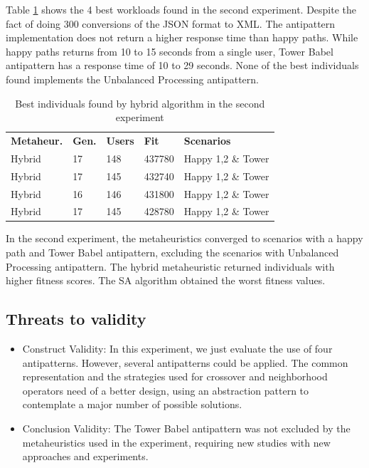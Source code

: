 \documentclass[espaco=umemeio,chapter=TITLE,twoside,openright]{abnt}
\begin{document}
Table \ref{tab:bestindividuals2} shows the 4 best workloads found in the second experiment. Despite the fact of doing 300 conversions of the JSON format to XML. The antipattern implementation does not return a higher response time than happy paths. While happy paths returns from 10 to 15 seconds from a single user, Tower Babel antipattern has a response time of 10 to 29 seconds. None of the best individuals found implements the Unbalanced Processing antipattern.


\begin{table}[h]
\centering
\caption{Best individuals found by hybrid algorithm in the second experiment}
\label{tab:bestindividuals2}
\begin{tabular}{lllll}
\rowcolor[HTML]{FFCCC9}
\textbf{Metaheur.} & \textbf{Gen.} & \textbf{Users} & \textbf{Fit} & \textbf{Scenarios}  \\
\multicolumn{1}{l}{Hybrid} & \multicolumn{1}{l}{17} & \multicolumn{1}{l}{148} & \multicolumn{1}{l}{437780} & \multicolumn{1}{l}{Happy 1,2 \& Tower}  \\
\multicolumn{1}{l}{Hybrid} & \multicolumn{1}{l}{17} & \multicolumn{1}{l}{145} & \multicolumn{1}{l}{432740} & \multicolumn{1}{l}{Happy 1,2 \& Tower}  \\
\multicolumn{1}{l}{Hybrid} & \multicolumn{1}{l}{16} & \multicolumn{1}{l}{146} & \multicolumn{1}{l}{431800} & \multicolumn{1}{l}{Happy 1,2 \& Tower} \\
\multicolumn{1}{l}{Hybrid} & \multicolumn{1}{l}{17} & \multicolumn{1}{l}{145} & \multicolumn{1}{l}{428780} & \multicolumn{1}{l}{Happy 1,2 \& Tower}  \\
\end{tabular}
\end{table}

In the second experiment, the metaheuristics converged to scenarios with a happy path and Tower Babel antipattern, excluding the scenarios with Unbalanced Processing antipattern. The hybrid metaheuristic returned individuals with higher fitness scores. The SA algorithm obtained the worst fitness values.

\subsection{Threats to validity}
\begin{itemize}
\item Construct Validity:
In this experiment, we just evaluate the use of four antipatterns. However, several antipatterns could be applied.  The common representation and the strategies used for crossover and neighborhood operators need of a better design, using an abstraction pattern to contemplate a major number of possible solutions.
\item Conclusion Validity:
The Tower Babel antipattern was not excluded by the metaheuristics used in the experiment, requiring new studies with new approaches and experiments.
\end{itemize}
\end{document}
